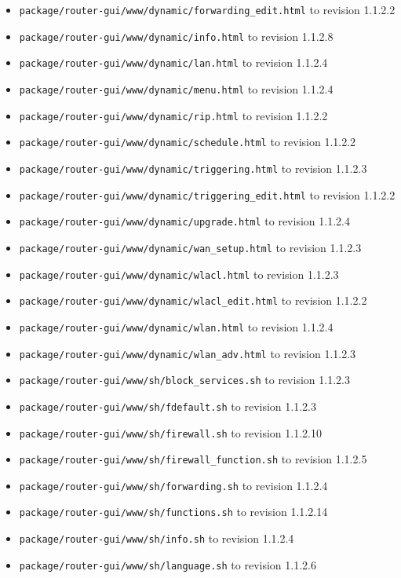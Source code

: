\documentclass[12pt]{report}
\begin{document}
\begin{itemize}
\begin{enumerate}
\begin{itemize}
	\item \texttt{package/router-gui/www/dynamic/forwarding\_edit.html} to revision 1.1.2.2
	\item \texttt{package/router-gui/www/dynamic/info.html} to revision 1.1.2.8
	\item \texttt{package/router-gui/www/dynamic/lan.html} to revision 1.1.2.4
	\item \texttt{package/router-gui/www/dynamic/menu.html} to revision 1.1.2.4
	\item \texttt{package/router-gui/www/dynamic/rip.html} to revision 1.1.2.2
	\item \texttt{package/router-gui/www/dynamic/schedule.html} to revision 1.1.2.2
	\item \texttt{package/router-gui/www/dynamic/triggering.html} to revision 1.1.2.3
	\item \texttt{package/router-gui/www/dynamic/triggering\_edit.html} to revision 1.1.2.2
	\item \texttt{package/router-gui/www/dynamic/upgrade.html} to revision 1.1.2.4
	\item \texttt{package/router-gui/www/dynamic/wan\_setup.html} to revision 1.1.2.3
	\item \texttt{package/router-gui/www/dynamic/wlacl.html} to revision 1.1.2.3
	\item \texttt{package/router-gui/www/dynamic/wlacl\_edit.html} to revision 1.1.2.2
	\item \texttt{package/router-gui/www/dynamic/wlan.html} to revision 1.1.2.4
	\item \texttt{package/router-gui/www/dynamic/wlan\_adv.html} to revision 1.1.2.3
	\item \texttt{package/router-gui/www/sh/block\_services.sh} to revision 1.1.2.3
	\item \texttt{package/router-gui/www/sh/fdefault.sh} to revision 1.1.2.3
	\item \texttt{package/router-gui/www/sh/firewall.sh} to revision 1.1.2.10
	\item \texttt{package/router-gui/www/sh/firewall\_function.sh} to revision 1.1.2.5
	\item \texttt{package/router-gui/www/sh/forwarding.sh} to revision 1.1.2.4
	\item \texttt{package/router-gui/www/sh/functions.sh} to revision 1.1.2.14
	\item \texttt{package/router-gui/www/sh/info.sh} to revision 1.1.2.4
	\item \texttt{package/router-gui/www/sh/language.sh} to revision 1.1.2.6

\end{itemize}
\end{enumerate}
\end{itemize}
\end{document}
